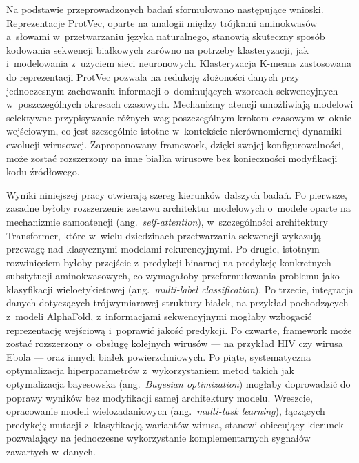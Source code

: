 Na podstawie przeprowadzonych badań sformułowano następujące wnioski. Reprezentacje ProtVec, oparte na analogii między trójkami aminokwasów a~słowami w~przetwarzaniu języka naturalnego, stanowią skuteczny sposób kodowania sekwencji białkowych zarówno na potrzeby klasteryzacji, jak i~modelowania z~użyciem sieci neuronowych. Klasteryzacja K-means zastosowana do reprezentacji ProtVec pozwala na redukcję złożoności danych przy jednoczesnym zachowaniu informacji o~dominujących wzorcach sekwencyjnych w~poszczególnych okresach czasowych. Mechanizmy atencji umożliwiają modelowi selektywne przypisywanie różnych wag poszczególnym krokom czasowym w~oknie wejściowym, co jest szczególnie istotne w~kontekście nierównomiernej dynamiki ewolucji wirusowej. Zaproponowany framework, dzięki swojej konfigurowalności, może zostać rozszerzony na inne białka wirusowe bez konieczności modyfikacji kodu źródłowego.

Wyniki niniejszej pracy otwierają szereg kierunków dalszych badań. Po pierwsze, zasadne byłoby rozszerzenie zestawu architektur modelowych o~modele oparte na mechanizmie samoatencji (ang.~\textit{self-attention}), w~szczególności architektury Transformer, które w~wielu dziedzinach przetwarzania sekwencji wykazują przewagę nad klasycznymi modelami rekurencyjnymi. Po drugie, istotnym rozwinięciem byłoby przejście z~predykcji binarnej na predykcję konkretnych substytucji aminokwasowych, co wymagałoby przeformułowania problemu jako klasyfikacji wieloetykietowej (ang.~\textit{multi-label classification}). Po trzecie, integracja danych dotyczących trójwymiarowej struktury białek, na przykład pochodzących z~modeli AlphaFold, z~informacjami sekwencyjnymi mogłaby wzbogacić reprezentację wejściową i~poprawić jakość predykcji. Po czwarte, framework może zostać rozszerzony o~obsługę kolejnych wirusów --- na przykład HIV czy wirusa Ebola --- oraz innych białek powierzchniowych. Po piąte, systematyczna optymalizacja hiperparametrów z~wykorzystaniem metod takich jak optymalizacja bayesowska (ang.~\textit{Bayesian optimization}) mogłaby doprowadzić do poprawy wyników bez modyfikacji samej architektury modelu. Wreszcie, opracowanie modeli wielozadaniowych (ang.~\textit{multi-task learning}), łączących predykcję mutacji z~klasyfikacją wariantów wirusa, stanowi obiecujący kierunek pozwalający na jednoczesne wykorzystanie komplementarnych sygnałów zawartych w~danych.
